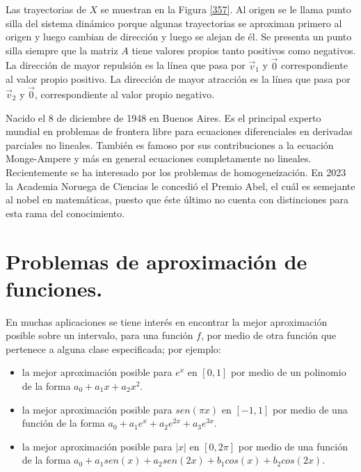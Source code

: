 Las trayectorias de $X$ se muestran en la Figura  \ref{357}.
Al origen se le llama punto silla del sistema dinámico porque algunas
trayectorias se aproximan primero al origen y luego cambian de dirección y luego se alejan de
él.
Se presenta un punto silla siempre que la matriz $A$ tiene valores propios tanto positivos
como negativos. La dirección de mayor repulsión es la línea que pasa por $\Vec{v}_1$ y $\Vec{0}$
correspondiente al valor propio positivo. La dirección de mayor atracción es la línea que
pasa por $\Vec{v}_2$ y $\Vec{0}$, correspondiente al valor propio negativo.


\bigskip



\begin{parchment} {Nacido el 8 de diciembre de 1948 en Buenos Aires. Es el principal experto mundial en problemas de frontera libre para ecuaciones diferenciales en derivadas parciales no lineales. También es famoso por sus contribuciones a la ecuación Monge-Ampere y más en general ecuaciones completamente no lineales. Recientemente se ha interesado por los problemas de homogeneización.
En 2023 la Academia Noruega de Ciencias le concedió el Premio Abel, el cuál es semejante al nobel en matemáticas, puesto que éste último no cuenta con distinciones para esta rama del conocimiento. \cite{LuisC} }
\end{parchment}


\bigskip

\section{Problemas de aproximación de funciones.}

En muchas aplicaciones se tiene interés en encontrar la mejor aproximación posible sobre un intervalo, para una función $f$, por medio de otra función que pertenece a alguna clase especificada; por ejemplo:

\begin{itemize}
\item  la mejor aproximación posible para $e^x$ en $[0,1]$ por medio de un polinomio de la forma $a_0+a_1x + a_2 x^2$.
\item  la mejor aproximación posible para $sen( \pi x)$ en $[-1,1]$ por medio de una función de la forma $a_0+a_1e^x + a_2 e^{2x}+ a_3 e^{3x}$.

\item  la mejor aproximación posible para $  \left| x   \right|$ en $[0,2 \pi]$ por medio de una función de la forma $a_0+a_1 sen(x) + a_2 sen(2x)+ b_1 cos(x) + b_2 cos(2x)$.


\end{itemize} 


